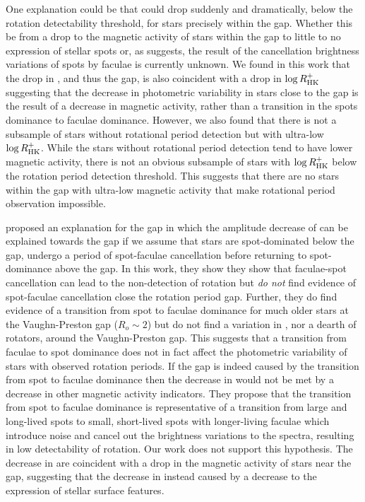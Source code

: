 One explanation could be that \rper{} could drop suddenly and dramatically, below the rotation detectability threshold, for stars precisely within the gap.
Whether this be from a drop to the magnetic activity of stars within the gap to little to no expression of stellar spots or, as \citet{reinhold_spot_2018} suggests, the result of the cancellation brightness variations of spots by faculae is currently unknown.
We found in this work that the drop in \rper{}, and thus the gap, is also coincident with a drop in $\log R^{+}_{\rm{HK}}$ suggesting that the decrease in photometric variability in stars close to the gap is the result of a decrease in magnetic activity, rather than a transition in the spots dominance to faculae dominance.
However, we also found that there is not a subsample of stars without rotational period detection but with ultra-low $\log R^{+}_{\rm{HK}}$.
While the stars without rotational period detection tend to have lower magnetic activity, there is not an obvious subsample of stars with $\log R^{+}_{\rm{HK}}$ below the rotation period detection threshold.
This suggests that there are no stars within the gap with ultra-low magnetic activity that make rotational period observation impossible.

\citet{reinhold_spot_2018} proposed an explanation for the gap in which the amplitude decrease of \rper{} can be explained towards the gap if we assume that stars are spot-dominated below the gap, undergo a period of spot-faculae cancellation before returning to spot-dominance above the gap.
In this work, they show they show that faculae-spot cancellation can lead to the non-detection of rotation but \textit{do not} find evidence of spot-faculae cancellation close the rotation period gap.
Further, they do find evidence of a transition from spot to faculae dominance for much older stars at the Vaughn-Preston gap ($R_o \sim 2$) but do not find a variation in \rper{}, nor a dearth of rotators, around the Vaughn-Preston gap.
This suggests that a transition from faculae to spot dominance does not in fact affect the photometric variability of stars with observed rotation periods.
If the gap is indeed caused by the transition from spot to faculae dominance then the decrease in \rper{} would not be met by a decrease in other magnetic activity indicators.
They propose that the transition from spot to faculae dominance is representative of a transition from large and long-lived spots to small, short-lived spots with longer-living faculae which introduce noise and cancel out the brightness variations to the spectra, resulting in low detectability of rotation.
Our work does not support this hypothesis.
The decrease in \rper{} are coincident with a drop in the magnetic activity of stars near the gap, suggesting that the decrease in \rper{} instead caused by a decrease to the expression of stellar surface features. 

